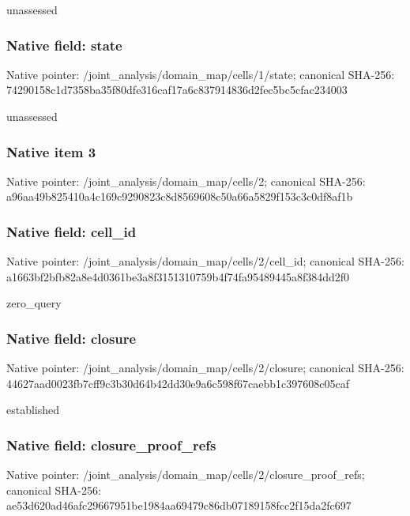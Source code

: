 \documentclass[10pt,a4paper]{article}
\begin{document}
\begingroup\raggedright\sloppy unassessed\par\endgroup

\subsubsection{Native field: state}
Native pointer: /joint\_\allowbreak{}analysis/domain\_\allowbreak{}map/cells/1/state; canonical SHA-256: 74290158c1d7358ba35f80dfe316caf17a6c837914836d2fec5bc5cfac234003

\begingroup\raggedright\sloppy unassessed\par\endgroup

\subsubsection{Native item 3}
Native pointer: /joint\_\allowbreak{}analysis/domain\_\allowbreak{}map/cells/2; canonical SHA-256: a96aa49b825410a4c169c9290823c8d8569608c50a66a5829f153c3c0df8af1b

\subsubsection{Native field: cell\_\allowbreak{}id}
Native pointer: /joint\_\allowbreak{}analysis/domain\_\allowbreak{}map/cells/2/cell\_\allowbreak{}id; canonical SHA-256: a1663bf2bfb82a8e4d0361be3a8f3151310759b4f74fa95489445a8f384dd2f0

\begingroup\raggedright\sloppy zero\_\allowbreak{}query\par\endgroup

\subsubsection{Native field: closure}
Native pointer: /joint\_\allowbreak{}analysis/domain\_\allowbreak{}map/cells/2/closure; canonical SHA-256: 44627aad0023fb7cff9c3b30d64b42dd30e9a6c598f67caebb1c397608c05caf

\begingroup\raggedright\sloppy established\par\endgroup

\subsubsection{Native field: closure\_\allowbreak{}proof\_\allowbreak{}refs}
Native pointer: /joint\_\allowbreak{}analysis/domain\_\allowbreak{}map/cells/2/closure\_\allowbreak{}proof\_\allowbreak{}refs; canonical SHA-256: ae53d620ad46afc29667951be1984aa69479c86db07189158fcc2f15da2fc697
\end{document}
